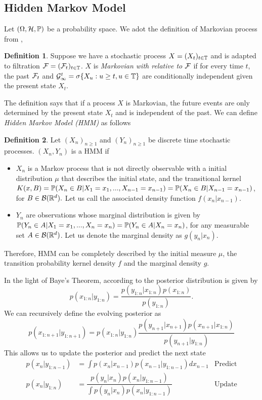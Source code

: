 \documentclass[10pt]{article}
\theoremstyle{definition}
\newtheorem{definition}{Definition}
\numberwithin{equation}{section}
\begin{document}
\subsection{Hidden Markov Model}
Let $(\Omega,\mathcal{H},\mathbb{P})$ be a probability space. We adot the definition of Markovian process from \cite{cinlar},
\begin{definition}
	Suppose we have a stochastic process $X= (X_t)_{t \in \mathbb{T}}$  and is adapted to filtration $\mathcal{F}=(\mathcal{F}_t)_{t \in \mathbb{T}}$.  $X$ is \textit{Markovian with relative to} $\mathcal{F}$ if for every time $t$, the past $\mathcal{F}_t$ and $\mathcal{G}^t_\infty = \sigma\{X_u: u \geq t, u \in \mathbb{T} \}$ are conditionally independent given the present state $X_t$.
\end{definition}
The definition says that if a process $X$ is Markovian, the future events are only determined by the present state $X_t$ and is independent of the past. We can define \textit{Hidden Markov Model (HMM)} as follows \cite{}
\begin{definition}
	Let $(X_n)_{n \geq 1}$ and $(Y_n)_{n \geq 1}$ be discrete time stochastic processes. $(X_n, Y_n)$ is a HMM if
	\begin{itemize}
		\item $X_n$ is a Markov process that is not directly observable with a initial distribution $\mu$ that describes the initial state, and the transitional kernel $K(x,B)  = \mathbb{P}(X_n \in B |  X_1 = x_1, ..., X_{n-1} = x_{n-1}) = \mathbb{P}(X_n \in B | X_{n-1}=x_{n-1})$, for $B \in \mathcal{B}(\mathbb{R}^d).$ Let us call the associated density function $f(x_n|x_{n-1})$.
		\item $Y_n$ are observations whose marginal distribution is given by $\mathbb{P}(Y_n \in A| X_1 = x_1, ..., X_n = x_n) = \mathbb{P}(Y_n \in A|X_n = x_n)$, for any measurable set $A \in \mathcal{B}(\mathbb{R}^d)$. Let us denote the marginal density as $g(y_n|x_n)$.
	\end{itemize}
	
	Therefore, HMM can be completely described by the initial measure $\mu$, the transition probability kernel density $f$ and the marginal density $g$.
	
\end{definition}

In the light of Baye's Theorem, according to \cite{SMCinPrac} the posterior distribution is given by
\begin{equation}
p(x_{1:n}|y_{1:n}) = \dfrac{p(y_{1:n}|x_{1:n})p(x_{1:n})}{p(y_{1:n})}.
\end{equation}
We can recursively define the evolving posterior as
\begin{equation}
p(x_{1:n+1}|y_{1:n+1}) = p(x_{1:n}|y_{1:n}) \dfrac{p(y_{n+1}|x_{n+1})p(x_{n+1}|x_{1:n})}{p(y_{n+1}|y_{1:n})}
\end{equation}
This allows us to update the posterior and predict the next state  
\begin{align}
p(x_n|y_{1:n-1}) &= \int p(x_{n}|x_{n-1})p(x_{n-1}|y_{1:n-1}) dx_{n-1} &\text{Predict}\\
p(x_n|y_{1:n}) &= \dfrac{p(y_n|x_n)p(x_n|y_{1:n-1})}{\int p(y_n|x_n)p(x_n|y_{1:n-1})} &\text{Update}
\end{align}
\end{document}
